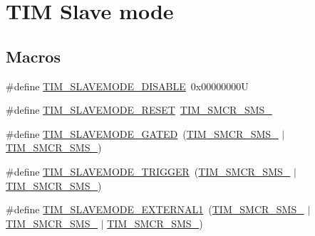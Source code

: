 \hypertarget{group___t_i_m___slave___mode}{}\section{T\+IM Slave mode}
\label{group___t_i_m___slave___mode}
\subsection*{Macros}
\begin{DoxyCompactItemize}
\item 
\#define \hyperlink{group___t_i_m___slave___mode_ga3b53e1a85d08f125df4371f86bdaf79b}{T\+I\+M\+\_\+\+S\+L\+A\+V\+E\+M\+O\+D\+E\+\_\+\+D\+I\+S\+A\+B\+LE}~0x00000000U
\item 
\#define \hyperlink{group___t_i_m___slave___mode_ga9f28e350c0560dc550f5c0d2f8b39ba7}{T\+I\+M\+\_\+\+S\+L\+A\+V\+E\+M\+O\+D\+E\+\_\+\+R\+E\+S\+ET}~\hyperlink{group___peripheral___registers___bits___definition_ga63847fc3c71f582403e6301b1229c3ed}{T\+I\+M\+\_\+\+S\+M\+C\+R\+\_\+\+S\+M\+S\+\_}
\item 
\#define \hyperlink{group___t_i_m___slave___mode_ga4501317fcd7649e5ff46db6fe69938e0}{T\+I\+M\+\_\+\+S\+L\+A\+V\+E\+M\+O\+D\+E\+\_\+\+G\+A\+T\+ED}~(\hyperlink{group___peripheral___registers___bits___definition_ga63847fc3c71f582403e6301b1229c3ed}{T\+I\+M\+\_\+\+S\+M\+C\+R\+\_\+\+S\+M\+S\+\_} $\vert$ \hyperlink{group___peripheral___registers___bits___definition_ga7d1ebece401aeb12abd466d2eafa78b2}{T\+I\+M\+\_\+\+S\+M\+C\+R\+\_\+\+S\+M\+S\+\_})
\item 
\#define \hyperlink{group___t_i_m___slave___mode_ga12f8f7b4a16b438f54cf811f0bb0a8a4}{T\+I\+M\+\_\+\+S\+L\+A\+V\+E\+M\+O\+D\+E\+\_\+\+T\+R\+I\+G\+G\+ER}~(\hyperlink{group___peripheral___registers___bits___definition_ga63847fc3c71f582403e6301b1229c3ed}{T\+I\+M\+\_\+\+S\+M\+C\+R\+\_\+\+S\+M\+S\+\_} $\vert$ \hyperlink{group___peripheral___registers___bits___definition_gaa980a3121ab6cda5a4a42b959da8421e}{T\+I\+M\+\_\+\+S\+M\+C\+R\+\_\+\+S\+M\+S\+\_})
\item 
\#define \hyperlink{group___t_i_m___slave___mode_ga90dcf32a66dcb250b18da2ff56471328}{T\+I\+M\+\_\+\+S\+L\+A\+V\+E\+M\+O\+D\+E\+\_\+\+E\+X\+T\+E\+R\+N\+A\+L1}~(\hyperlink{group___peripheral___registers___bits___definition_ga63847fc3c71f582403e6301b1229c3ed}{T\+I\+M\+\_\+\+S\+M\+C\+R\+\_\+\+S\+M\+S\+\_} $\vert$ \hyperlink{group___peripheral___registers___bits___definition_gaa980a3121ab6cda5a4a42b959da8421e}{T\+I\+M\+\_\+\+S\+M\+C\+R\+\_\+\+S\+M\+S\+\_} $\vert$ \hyperlink{group___peripheral___registers___bits___definition_ga7d1ebece401aeb12abd466d2eafa78b2}{T\+I\+M\+\_\+\+S\+M\+C\+R\+\_\+\+S\+M\+S\+\_})
\end{DoxyCompactItemize}


